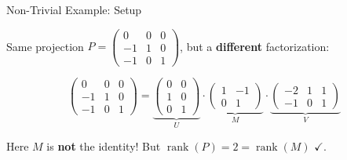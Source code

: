 \documentclass[10pt]{beamer}
\theoremstyle{definition}
\newcommand{\x}[1]{\alert{\textbf{#1}}}
\begin{document}
\begin{frame}{Non-Trivial Example: Setup}

Same projection $P = \begin{pmatrix} 0 & 0 & 0 \\ -1 & 1 & 0 \\ -1 & 0 & 1 \end{pmatrix}$, but a \x{different} factorization:

$$\begin{pmatrix} 0 & 0 & 0 \\ -1 & 1 & 0 \\ -1 & 0 & 1 \end{pmatrix} = \underbrace{\begin{pmatrix} 0 & 0 \\ 1 & 0 \\ 0 & 1 \end{pmatrix}}_{U} \cdot \underbrace{\begin{pmatrix} 1 & -1 \\ 0 & 1 \end{pmatrix}}_{M} \cdot \underbrace{\begin{pmatrix} -2 & 1 & 1 \\ -1 & 0 & 1 \end{pmatrix}}_{V}$$

Here $M$ is \x{not} the identity! But $\operatorname{rank}(P) = 2 = \operatorname{rank}(M)$ $\checkmark$.

\end{frame}
\end{document}
